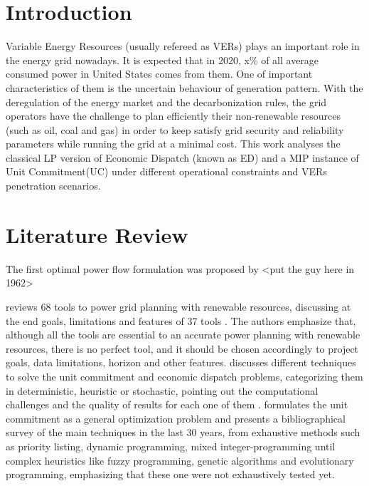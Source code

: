 \documentclass[12pt,LUDisStyle,twosided]{book}
\begin{document}
\pagestyle{plain}
\dissertationtrue



\tableofcontents
\nopagebreak
{}
\listoftables
{}
\listoffigures
\newpage
\pagestyle{plain}

\pagestyle{plain}

\chapter{Introduction}

Variable Energy Resources (usually refereed as VERs) plays an important role in the energy grid nowadays. It is expected that in 2020, x\% of all average consumed power in United States comes from them. One of important characteristics of them is the uncertain behaviour of generation pattern. With the deregulation of the energy market and the decarbonization rules, the grid operators have the challenge to plan efficiently their non-renewable resources (such as oil, coal and gas) in order to keep satisfy grid security and reliability parameters while running the grid at a minimal cost. This work analyses the classical LP version of Economic Dispatch (known as ED) and a MIP instance of Unit Commitment(UC) under different operational constraints and VERs penetration  scenarios.

\chapter{Literature Review}

The first optimal power flow formulation was proposed by <put the guy here in 1962>

\citeauthor{connolly} reviews 68 tools to power grid planning with renewable resources, discussing at the end goals, limitations and features of 37 tools \cite{connolly}. The authors emphasize that, although all the tools are essential to an accurate power planning with renewable resources, there is no perfect tool, and it should be chosen accordingly to project goals, data limitations, horizon and other features. \citeauthor{yamin} discusses different techniques to solve the unit commitment and economic dispatch problems, categorizing them in deterministic, heuristic or stochastic, pointing out the computational challenges and the quality of results for each one of them \cite{yamin}. \citeauthor{padhy} formulates the unit commitment as a general optimization problem and presents a bibliographical survey of the main techniques in the last 30 years, from exhaustive methods such as priority listing, dynamic programming, mixed integer-programming  until complex heuristics like fuzzy programming, genetic algorithms and evolutionary programming, emphasizing that these one were not exhaustively tested yet.
\end{document}
